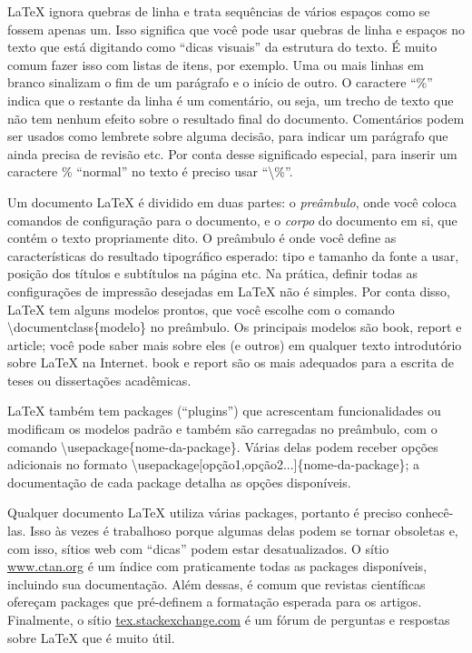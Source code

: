 \LaTeX{} ignora quebras de linha e trata sequências de vários espaços como
se fossem apenas um. Isso significa que você pode usar quebras de linha e
espaços no texto que está digitando como ``dicas visuais'' da estrutura do
texto. É muito comum fazer isso com listas de itens, por exemplo. Uma ou
mais linhas em branco sinalizam o fim de um parágrafo e o início de outro.
O caractere ``\%'' indica que o restante da linha é um comentário,
ou seja, um trecho de texto que não tem nenhum efeito sobre o resultado final
do documento. Comentários podem ser usados como lembrete sobre alguma decisão,
para indicar um parágrafo que ainda precisa de revisão etc. Por conta desse
significado especial, para inserir um caractere \% ``normal'' no
texto é preciso usar ``\textsf{\textbackslash\%}''.

Um documento \LaTeX{} é dividido em duas partes: o \emph{preâmbulo}, onde
você coloca comandos de configuração para o documento, e o \emph{corpo} do
documento em si, que contém o texto propriamente dito. O preâmbulo é onde
você define as características do resultado tipográfico esperado: tipo e
tamanho da fonte a usar, posição dos títulos e subtítulos na página etc.
Na prática, definir todas as configurações de impressão desejadas em
\LaTeX{} não é simples. Por conta disso, \LaTeX{} tem alguns modelos
prontos, que você escolhe com o comando
\textsf{\textbackslash{}documentclass\{modelo\}} no preâmbulo. Os
principais modelos são \textsf{book}, \textsf{report} e \textsf{article};
você pode saber mais sobre eles (e outros) em qualquer texto introdutório
sobre \LaTeX{} na Internet. \textsf{book} e \textsf{report} são os mais
adequados para a escrita de teses ou dissertações acadêmicas.

\LaTeX{} também tem packages (``plugins'') que acrescentam funcionalidades
ou modificam os modelos padrão e também são carregadas no preâmbulo, com o
comando \textsf{\textbackslash{}usepackage\{nome-da-package\}}. Várias
delas podem receber opções adicionais no formato
\textsf{\textbackslash{}usepackage[opção1,opção2...]\{nome-da-package\}};
a documentação de cada package detalha as opções disponíveis.

Qualquer documento \LaTeX{} utiliza várias packages, portanto é preciso
conhecê-las. Isso às vezes é trabalhoso porque algumas delas podem se
tornar obsoletas e, com isso, sítios web com ``dicas'' podem estar
desatualizados. O sítio \url{www.ctan.org} é um índice com praticamente
todas as packages disponíveis, incluindo sua documentação. Além dessas,
é comum que revistas científicas ofereçam packages que pré-definem a
formatação esperada para os artigos. Finalmente, o sítio
\url{tex.stackexchange.com} é um fórum de perguntas e respostas sobre
\LaTeX{} que é muito útil.

